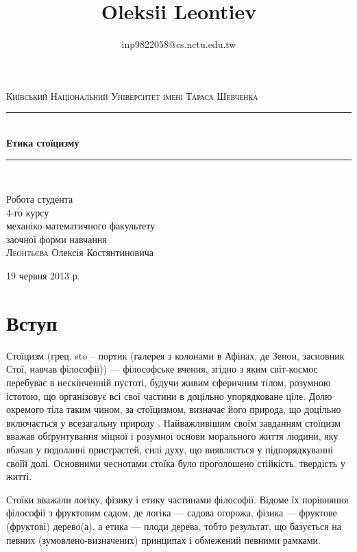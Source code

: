 \documentclass[14pt]{extarticle} %
\title{\bfseries\Huge Oleksii Leontiev}
\author{inp9822058@cs.nctu.edu.tw}
\date{}
\begin{document}
\begin{titlepage}
	\addtolength{\voffset}{-2cm}
	\thispagestyle{fancy}
	\begin{center}
		\newcommand{\HRule}{\rule{\linewidth}{0.5mm}}
		\textsc{\Large Київський Національний Університет імені Тараса Шевченка}\\[1.5cm]

		\HRule \\[0.4cm]
		{ \huge \bfseries Етика стоїцизму}\\[0.4cm]

		\HRule \\[1.5cm]

			\begin{flushright} \large
				Робота студента\\
				4-го курсу\\
				механіко-математичного факультету\\
				заочної форми навчання\\
				\textsc{Леонтьєва} Олексія Костянтиновича
			\end{flushright}

		\vfill

		{\large 19 червня 2013 р.}
	\end{center}
\end{titlepage}
\section{Вступ}%
Стоїцизм (грец. sto -- портик (галерея з колонами в Афінах, де Зенон, засновник Стої, навчав філософії)) — філософське вчення, згідно з
яким світ-космос перебуває в нескінченній пустоті, будучи живим сферичним тілом, розумною істотою, що організовує всі свої частини в
доцільно упорядковане ціле. Долю окремого тіла таким чином, за стоїцизмом, визначає його природа, що доцільно включається у всезагальну природу
. Найважливішим своїм завданням стоїцизм вважав обґрунтування міцної і розумної основи морального життя людини, яку вбачав у
подоланні пристрастей, силі духу, що виявляється у підпорядкуванні своїй долі. Основними чеснотами стоїка було проголошено стійкість, 
твердість у житті.

Стоїки вважали логіку, фізику і етику частинами філософії. Відоме їх порівняння філософії з фруктовим садом, де логіка — садова огорожа, фізика 
— фруктове (фруктові) дерево(а), а етика — плоди дерева, тобто результат, що базується на певних (зумовлено-визначених) принципах
і обмежений певними рамками.
\end{document}
